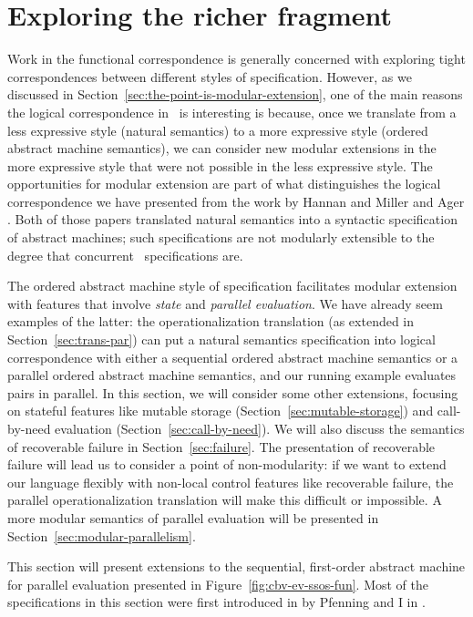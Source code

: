 \section{Exploring the richer fragment}
\label{sec:richer-ordered-abstract}

Work in the functional correspondence is generally concerned with
exploring tight correspondences between different styles of
specification. However, as we discussed in
Section~\ref{sec:the-point-is-modular-extension}, one of the main
reasons the logical correspondence in \sls~is interesting is because,
once we translate from a less expressive style (natural
semantics) to a more expressive style (ordered abstract machine
semantics), we can consider new modular extensions in the more
expressive style that were not possible in the less expressive
style. The opportunities for modular extension are part of what
distinguishes the logical correspondence we have presented from the
work by Hannan and Miller \cite{hannan92operational} and Ager
\cite{ager04natural}. Both of those papers translated natural
semantics into a syntactic specification of abstract machines; such
specifications are not modularly extensible to the degree that
concurrent \sls~specifications are.

The ordered abstract machine style of specification facilitates
modular extension with features that involve {\it state} and {\it
  parallel evaluation}. We have already seem examples of the latter:
the operationalization translation (as extended in
Section~\ref{sec:trans-par}) can put a natural semantics specification
into logical correspondence with either a sequential ordered abstract
machine semantics or a parallel ordered abstract machine semantics,
and our running example evaluates pairs in parallel. In this section,
we will consider some other extensions, focusing on stateful features
like mutable storage (Section~\ref{sec:mutable-storage}) and
call-by-need evaluation (Section~\ref{sec:call-by-need}). We will also
discuss the semantics of recoverable failure in
Section~\ref{sec:failure}. The presentation of recoverable failure
will lead us to consider a point of non-modularity: if we want to
extend our language flexibly with non-local control features like
recoverable failure, the parallel operationalization translation will
make this difficult or impossible.  A more modular semantics of
parallel evaluation will be presented in
Section~\ref{sec:modular-parallelism}.

This section will present extensions to the sequential, first-order
abstract machine for parallel evaluation presented in
Figure~\ref{fig:cbv-ev-ssos-fun}. Most of the specifications in
this section were first introduced in by Pfenning and I in
\cite{pfenning09substructural}.

